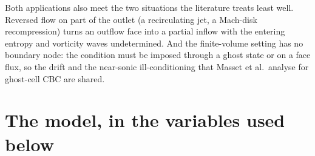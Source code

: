 \documentclass[11pt,a4paper]{article}
\begin{document}
Both applications also meet the two situations the literature treats
least well.  Reversed flow on part of the outlet (a recirculating jet, a
Mach-disk recompression) turns an outflow face into a partial inflow
with the entering entropy and vorticity waves undetermined.  And the
finite-volume setting has no boundary node: the condition must be
imposed through a ghost state or on a face flux, so the drift and the
near-sonic ill-conditioning that Masset et al.\ analyse for ghost-cell
CBC are shared.


\section{The model, in the variables used below}
\end{document}
